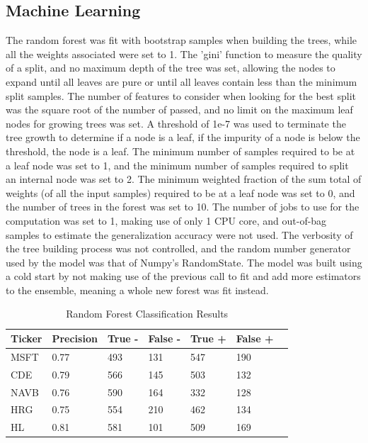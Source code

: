 \documentclass[times]{jtitauth}
\begin{document}
\subsection{Machine Learning}

The random forest was fit with bootstrap samples when building the trees, while all the weights associated were set to 1. The 'gini' function to measure the quality of a split, and no maximum depth of the tree was set, allowing the nodes to expand until all leaves are pure or until all leaves contain less than the minimum split samples. The number of features to consider when looking for the best split was the square root of the number of passed, and no limit on the maximum leaf nodes for growing trees was set. A threshold of 1e-7 was used to terminate the tree growth to determine if a node is a leaf, if the impurity of a node is below the threshold, the node is a leaf. The minimum number of samples required to be at a leaf node was set to 1, and the minimum number of samples required to split an internal node was set to 2. The minimum weighted fraction of the sum total of weights (of all the input samples) required to be at a leaf node was set to 0, and the number of trees in the forest was set to 10. The number of jobs to use for the computation was set to 1, making use of only 1 CPU core, and out-of-bag samples to estimate the generalization accuracy were not used. The verbosity of the tree building process was not controlled, and the random number generator used by the model was that of Numpy's RandomState. The model was built using a cold start by not making use of the previous call to fit and add more estimators to the ensemble, meaning a whole new forest was fit instead. 

\begin{table}
    \centering
        \begin{tabular}{ | l | l | l | | l | l | l | p{5cm} |}
        \hline
        Ticker & Precision & True - & False - & True + & False + \\ \hline
        MSFT & 0.77 & 493 & 131 & 547 & 190 \\ \hline
        CDE & 0.79 & 566 & 145 & 503 & 132 \\ \hline
        NAVB & 0.76 & 590 & 164 & 332 & 128 \\ \hline
        HRG & 0.75 & 554 & 210 & 462 & 134 \\ \hline
        HL & 0.81 & 581 & 101 & 509 & 169 \\
        \hline
        \end{tabular}
    \caption{Random Forest Classification Results}
\end{table}
\end{document}
